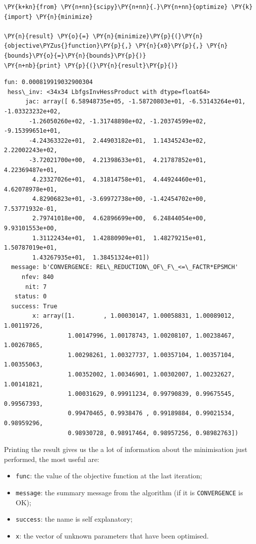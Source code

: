 \begin{itemize}
\begin{tcolorbox}[breakable, size=fbox, boxrule=1pt, pad at break*=1mm,colback=cellbackground, colframe=cellborder]
\begin{Verbatim}[commandchars=\\\{\}]
\PY{k+kn}{from} \PY{n+nn}{scipy}\PY{n+nn}{.}\PY{n+nn}{optimize} \PY{k}{import} \PY{n}{minimize}

\PY{n}{result} \PY{o}{=} \PY{n}{minimize}\PY{p}{(}\PY{n}{objective\PYZus{}function}\PY{p}{,} \PY{n}{x0}\PY{p}{,} \PY{n}{bounds}\PY{o}{=}\PY{n}{bounds}\PY{p}{)}
\PY{n+nb}{print} \PY{p}{(}\PY{n}{result}\PY{p}{)}
\end{Verbatim}
\end{tcolorbox}

\begin{Verbatim}[commandchars=\\\{\}]
      fun: 0.000819919032900304
 hess\_inv: <34x34 LbfgsInvHessProduct with dtype=float64>
      jac: array([ 6.58948735e+05, -1.58720803e+01, -6.53143264e+01,
-1.03323232e+02,
       -1.26050260e+02, -1.31748898e+02, -1.20374599e+02, -9.15399651e+01,
       -4.24363322e+01,  2.44903182e+01,  1.14345243e+02,  2.22002243e+02,
       -3.72021700e+00,  4.21398633e+01,  4.21787852e+01,  4.22369487e+01,
        4.23327026e+01,  4.31814758e+01,  4.44924460e+01,  4.62078978e+01,
        4.82906823e+01, -3.69972738e+00, -1.42454702e+00,  7.53771932e-01,
        2.79741018e+00,  4.62896699e+00,  6.24844054e+00,  9.93101553e+00,
        1.31122434e+01,  1.42880909e+01,  1.48279215e+01,  1.50787019e+01,
        1.43267935e+01,  1.38451324e+01])
  message: b'CONVERGENCE: REL\_REDUCTION\_OF\_F\_<=\_FACTR*EPSMCH'
     nfev: 840
      nit: 7
   status: 0
  success: True
        x: array([1.        , 1.00030147, 1.00058831, 1.00089012, 1.00119726,
                  1.00147996, 1.00178743, 1.00208107, 1.00238467, 1.00267865,
                  1.00298261, 1.00327737, 1.00357104, 1.00357104, 1.00355063,
                  1.00352002, 1.00346901, 1.00302007, 1.00232627, 1.00141821,
                  1.00031629, 0.99911234, 0.99790839, 0.99675545, 0.99567393,
                  0.99470465, 0.9938476 , 0.99189884, 0.99021534, 0.98959296,
                  0.98930728, 0.98917464, 0.98957256, 0.98982763])
\end{Verbatim}
\end{itemize}

Printing the result gives us the a lot of information about the minimisation just performed, the most useful are:
\begin{itemize}
\item \texttt{func}: the value of the objective function at the last iteration;
\item \texttt{message}: the summary message from the algorithm (if it is \texttt{CONVERGENCE} is OK);
\item \texttt{success}: the name is self explanatory;
\item \texttt{x}: the vector of unknown parameters that have been optimised.
\end{itemize}

